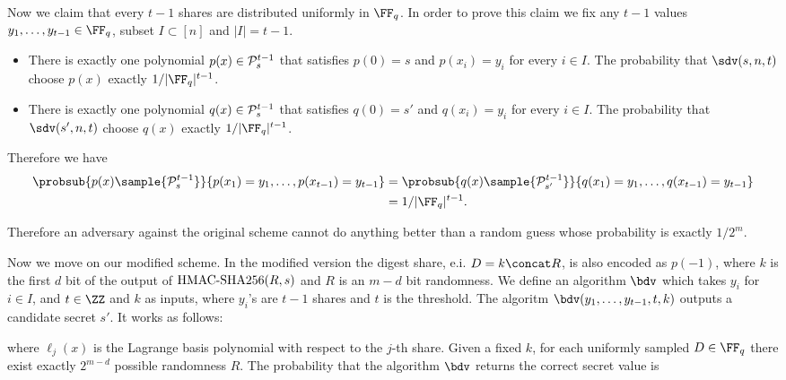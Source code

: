 \documentclass[envcountsame,runningheads,notitlepage]{llncs}
\begin{document}
	
	Now we claim that every $t-1$ shares are distributed uniformly in $\FF_q$. 
	In order to prove this claim we fix any $t-1$ values $y_1, \ldots, y_{t-1} \in \FF_q$, subset  $I \subset [n]$ and $|I| = t-1$. 
	\begin{itemize}
	 	\item There is exactly one polynomial $p(x) \in {\mathcal P}_{s}^{t - 1}$ that satisfies $p(0) = s$ and $p(x_{i}) = y_{i}$ for every $i \in I$. 
	 	The probability that $\sdv(s, n, t)$ choose $p(x)$ exactly $1/|\FF_q|^{t-1}$.
	 	\item There is exactly one polynomial $q(x) \in {\mathcal P}_{s}^{t - 1}$ that satisfies $q(0) = s'$ and $q(x_{i}) = y_{i}$ for every $i \in I$. 
	 	The probability that $\sdv(s', n, t)$ choose $q(x)$ exactly $1/|\FF_q|^{t-1}$.
	\end{itemize}
	Therefore we have
	\begin{align*}
		\probsub{p(x) \sample {\sP_{s}^{t - 1}}}{p(x_1) = y_1, \ldots, p(x_{t-1}) = y_{t-1}} &= \probsub{q(x) \sample {\sP_{s'}^{t - 1}}}{q(x_1) = y_1, \ldots, q(x_{t-1}) = y_{t-1}} \\
		&= 1/|\FF_q|^{t-1}.
	\end{align*}
	
	Therefore an adversary against the original scheme cannot do anything better than a random guess whose probability is exactly $1/2^m$.
	
	Now we move on our modified scheme. 	
	In the modified version the digest share, e.i. $D = k \concat R$, is also encoded as $p(-1)$, where  $k$ is the first $d$ bit of the output of ${\textrm{HMAC-SHA256}}(R, s)$ and $R$ is an $m - d$ bit randomness. 
	We define an algorithm $\bdv$ which takes $y_i$ for $i \in I$, and $t \in \ZZ$ and $k$ as inputs, where $y_i$'s are $t - 1$ shares and $t$ is the threshold.
	The algoritm $\bdv(y_1, \ldots, y_{t-1}, t, k)$ outputs a candidate secret $s'$. It works as follows:
	
	where $\ell_{j}(x)$ is the  Lagrange basis polynomial with respect to the $j$-th share.
	Given a fixed $k$, for each uniformly sampled $D \in \FF_q$ there exist exactly $2^{m - d}$ possible randomness $R$.  
	The probability that the algorithm $\bdv$ returns the correct secret value is 
	
\end{document}
